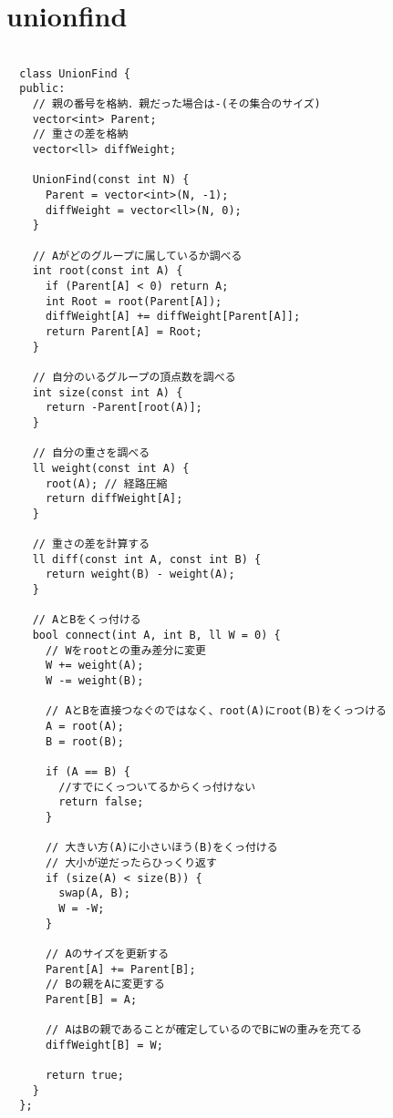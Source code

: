 \documentclass{jsarticle}
\begin{document}
\section{unionfind}
\color{black}
\begin{lstlisting}[caption=unionfind]

  class UnionFind {
  public:
    // 親の番号を格納．親だった場合は-(その集合のサイズ)
    vector<int> Parent;
    // 重さの差を格納
    vector<ll> diffWeight;
  
    UnionFind(const int N) {
      Parent = vector<int>(N, -1);
      diffWeight = vector<ll>(N, 0);
    }
  
    // Aがどのグループに属しているか調べる
    int root(const int A) {
      if (Parent[A] < 0) return A;
      int Root = root(Parent[A]);
      diffWeight[A] += diffWeight[Parent[A]];
      return Parent[A] = Root;
    }
  
    // 自分のいるグループの頂点数を調べる
    int size(const int A) {
      return -Parent[root(A)];
    }
  
    // 自分の重さを調べる
    ll weight(const int A) {
      root(A); // 経路圧縮
      return diffWeight[A];
    }
  
    // 重さの差を計算する
    ll diff(const int A, const int B) {
      return weight(B) - weight(A);
    }
  
    // AとBをくっ付ける
    bool connect(int A, int B, ll W = 0) {
      // Wをrootとの重み差分に変更
      W += weight(A);
      W -= weight(B);
  
      // AとBを直接つなぐのではなく、root(A)にroot(B)をくっつける
      A = root(A);
      B = root(B);
  
      if (A == B) {
        //すでにくっついてるからくっ付けない
        return false;
      }
  
      // 大きい方(A)に小さいほう(B)をくっ付ける
      // 大小が逆だったらひっくり返す
      if (size(A) < size(B)) {
        swap(A, B);
        W = -W;
      }
  
      // Aのサイズを更新する
      Parent[A] += Parent[B];
      // Bの親をAに変更する
      Parent[B] = A;
  
      // AはBの親であることが確定しているのでBにWの重みを充てる
      diffWeight[B] = W;
  
      return true;
    }
  };
  

\end{lstlisting}

\color{white}
\end{document}
